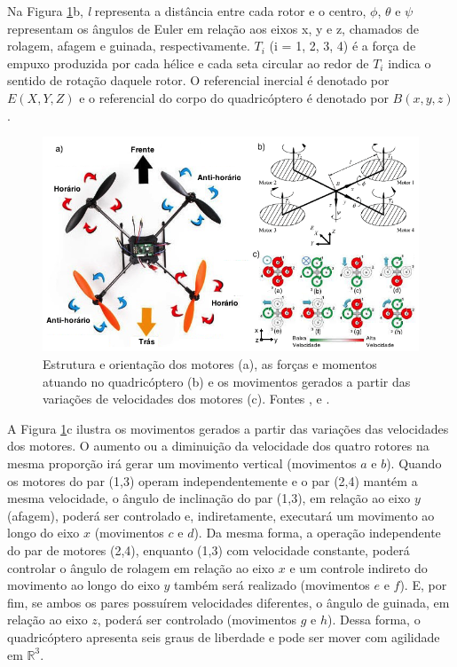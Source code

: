 \documentclass[a4paper, 12pt]{article}
\begin{document}
Na Figura \ref{fig:diag quad}b, \textit{l} representa a distância entre cada rotor e o centro, $\phi$, $\theta$ e $\psi$ representam os ângulos de Euler em relação aos eixos x, y e z, chamados de rolagem, afagem e guinada, respectivamente. $T_i$ (i = 1, 2, 3, 4) é a força de empuxo produzida por cada hélice e cada seta circular ao redor de $T_i$ indica o sentido de rotação daquele rotor. O referencial inercial é denotado por $E(X,Y,Z)$ e o referencial do corpo do quadricóptero é denotado por $B(x,y,z)$. 

\begin{figure}[h]
	\centering
		\includegraphics[scale=0.55]{img/diagrama_quadricoptero.png}
	\caption{Estrutura e orientação dos motores (a), as forças e momentos atuando no quadricóptero (b) e os movimentos gerados a partir das variações de velocidades dos motores (c). Fontes \cite{quadblog}, \cite{Mian2008} e \cite{Domingues2009}.}
	\label{fig:diag quad}
\end{figure}

A Figura \ref{fig:diag quad}c ilustra os movimentos gerados a partir das variações das velocidades dos motores. O aumento ou a diminuição da velocidade dos quatro rotores na mesma proporção irá gerar um movimento vertical (movimentos $a$ e $b$). Quando os motores do par (1,3) operam independentemente e o par (2,4) mantém a mesma velocidade, o ângulo de inclinação do par (1,3), em relação ao eixo $y$ (afagem), poderá ser controlado e, indiretamente, executará um movimento ao longo do eixo $x$ (movimentos $c$ e $d$). Da mesma forma, a operação independente do par de motores (2,4), enquanto (1,3) com velocidade constante, poderá controlar o ângulo de rolagem em relação ao eixo $x$ e um controle indireto do movimento ao longo do eixo $y$ também será realizado (movimentos $e$ e $f$). E, por fim, se ambos os pares possuírem velocidades diferentes, o ângulo de guinada, em relação ao eixo $z$, poderá ser controlado (movimentos $g$ e $h$). Dessa forma, o quadricóptero apresenta seis graus de liberdade e pode ser mover com agilidade em $\mathbb{R}^3$. 
\end{document}
